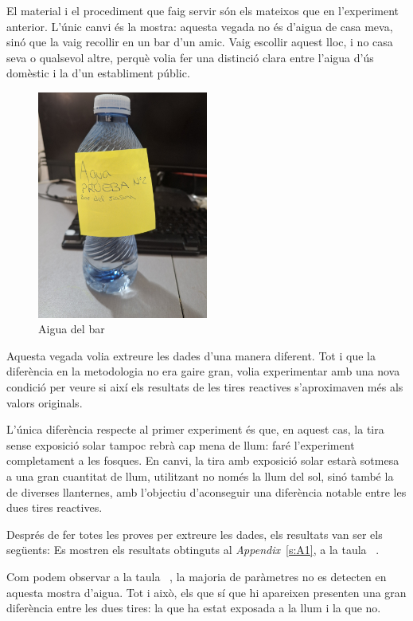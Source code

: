 El material i el procediment que faig servir són els mateixos que en l’experiment anterior. L’únic canvi és la mostra: aquesta vegada no és d’aigua de casa meva, sinó que la vaig recollir en un bar d’un amic. Vaig escollir aquest lloc, i no casa seva o qualsevol altre, perquè volia fer una distinció clara entre l’aigua d’ús domèstic i la d’un establiment públic.
\begin{figure}[H]
\centering
\includegraphics[width=0.5\textwidth, angle=270]{./Figures/AguaBar.png}
\caption{Aigua del bar}
\label{fig:AguaDelBar}
\end{figure}
Aquesta vegada volia extreure les dades d’una manera diferent. Tot i que la diferència en la metodologia no era gaire gran, volia experimentar amb una nova condició per veure si així els resultats de les tires reactives s’aproximaven més als valors originals.

L’única diferència respecte al primer experiment és que, en aquest cas, la tira sense exposició solar tampoc rebrà cap mena de llum: faré l’experiment completament a les fosques. En canvi, la tira amb exposició solar estarà sotmesa a una gran cuantitat de llum, utilitzant no només la llum del sol, sinó també la de diverses llanternes, amb l’objectiu d’aconseguir una diferència notable entre les dues tires reactives.

Després de fer totes les proves per extreure les dades, els resultats van ser els següents:
Es mostren els resultats obtinguts al \textit{Appendix}~\ref{s:A1}, a la taula ~.

Com podem observar a la taula~ , la majoria de paràmetres no es detecten en aquesta mostra d’aigua. Tot i això, els que sí que hi apareixen presenten una gran diferència entre les dues tires: la que ha estat exposada a la llum i la que no.

